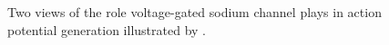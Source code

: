 \begin{figure}
\begin{center}
\caption{Two views of the role voltage-gated sodium channel plays in action potential generation illustrated by \SBGNAFLone.}\label{fig:AP}
\end{center}
\end{figure}















